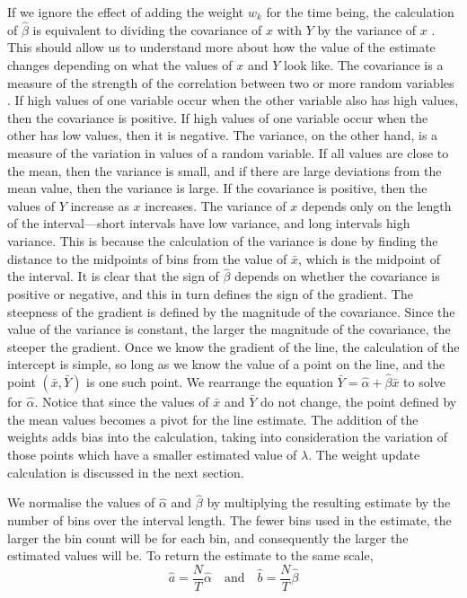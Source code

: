 \documentclass[a4paper,11pt]{article}
\begin{document}
If we ignore the effect of adding the weight $w_k$ for the time being, the
calculation of $\hat{\beta}$ is equivalent to dividing the covariance of $x$
with $Y$ by the variance of $x$ \cite{kenney1962mathematics}. This should allow
us to understand more about how the value of the estimate changes depending on
what the values of $x$ and $Y$ look like. The covariance is a measure of the
strength of the correlation between two or more random variables
\cite{covariance}. If high values of one variable occur when the other variable
also has high values, then the covariance is positive. If high values of one
variable occur when the other has low values, then it is negative. The variance,
on the other hand, is a measure of the variation in values of a random
variable. If all values are close to the mean, then the variance is small, and
if there are large deviations from the mean value, then the variance is
large. If the covariance is positive, then the values of $Y$ increase as $x$
increases. The variance of $x$ depends only on the length of the
interval---short intervals have low variance, and long intervals high
variance. This is because the calculation of the variance is done by finding the
distance to the midpoints of bins from the value of $\bar{x}$, which is the
midpoint of the interval. It is clear that the sign of $\hat{\beta}$ depends on
whether the covariance is positive or negative, and this in turn defines the
sign of the gradient. The steepness of the gradient is defined by the magnitude
of the covariance. Since the value of the variance is constant, the larger the
magnitude of the covariance, the steeper the gradient. Once we know the gradient
of the line, the calculation of the intercept is simple, so long as we know the
value of a point on the line, and the point $(\bar{x},\bar{Y})$ is one such
point. We rearrange the equation $\bar{Y}=\hat{\alpha}+\hat{\beta}\bar{x}$ to
solve for $\hat{\alpha}$. Notice that since the values of $\bar{x}$ and
$\bar{Y}$ do not change, the point defined by the mean values becomes a pivot
for the line estimate. The addition of the weights adds bias into the calculation,
taking into consideration the variation of those points which have a smaller
estimated value of $\lambda$. The weight update calculation is discussed in the
next section.

We normalise the values of $\hat{\alpha}$ and $\hat{\beta}$ by multiplying the
resulting estimate by the number of bins over the interval length. The fewer
bins used in the estimate, the larger the bin count will be for each bin, and
consequently the larger the estimated values will be. To return the estimate to
the same scale, 
\begin{equation}
\hat{a}=\frac{N}{T}\hat{\alpha}\quad\text{and}\quad
\hat{b}=\frac{N}{T}\hat{\beta}
\end{equation}
\end{document}
